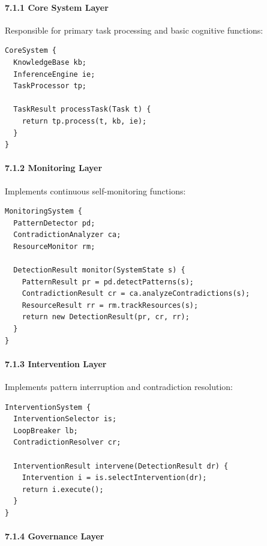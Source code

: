 \documentclass[
]{article}
\begin{document}
\paragraph{7.1.1 Core System Layer}\label{core-system-layer}

Responsible for primary task processing and basic cognitive functions:

\begin{verbatim}
CoreSystem {
  KnowledgeBase kb;
  InferenceEngine ie;
  TaskProcessor tp;
  
  TaskResult processTask(Task t) {
    return tp.process(t, kb, ie);
  }
}
\end{verbatim}

\paragraph{7.1.2 Monitoring Layer}\label{monitoring-layer}

Implements continuous self-monitoring functions:

\begin{verbatim}
MonitoringSystem {
  PatternDetector pd;
  ContradictionAnalyzer ca;
  ResourceMonitor rm;
  
  DetectionResult monitor(SystemState s) {
    PatternResult pr = pd.detectPatterns(s);
    ContradictionResult cr = ca.analyzeContradictions(s);
    ResourceResult rr = rm.trackResources(s);
    return new DetectionResult(pr, cr, rr);
  }
}
\end{verbatim}

\paragraph{7.1.3 Intervention Layer}\label{intervention-layer}

Implements pattern interruption and contradiction resolution:

\begin{verbatim}
InterventionSystem {
  InterventionSelector is;
  LoopBreaker lb;
  ContradictionResolver cr;
  
  InterventionResult intervene(DetectionResult dr) {
    Intervention i = is.selectIntervention(dr);
    return i.execute();
  }
}
\end{verbatim}

\paragraph{7.1.4 Governance Layer}\label{governance-layer}
\end{document}
